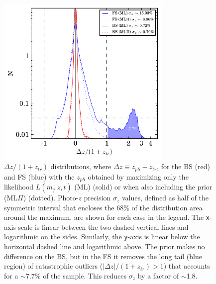 \begin{figure}
\centering
\includegraphics[width=84mm]{./plots/Dz_pau.pdf}
\caption{$\Delta z / (1+z_{tr})$ distributions, where $\Delta z \equiv z_{ph} - z_{tr}$, for the BS (red) and FS (blue) with the $z_{ph}$ obtained by maximizing only the likelihood $L(m_j|z,t)$ (ML) (solid) or when also including the prior (ML$\Pi$) (dotted). Photo-$z$ precision $\sigma_z$ values, defined as half of the symmetric interval that encloses the 68\% of the distribution area around the maximum, are shown for each case in the legend. The \texttt{x}-axis scale is linear between the two dashed vertical lines and logarithmic on the sides. Similarly, the \texttt{y}-axis is linear below the horizontal dashed line and logarithmic above. The prior makes no difference on the BS, but in the FS it removes the long tail (blue region) of catastrophic outliers ($|\Delta z|/(1+z_{tr})>1$) that accounts for a $\sim 7.7\%$ of the sample. This reduces $\sigma_z$ by a factor of $\sim$1.8.}
\label{dz_hist}
\end{figure}

